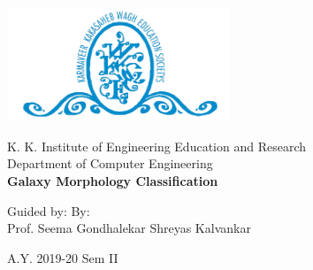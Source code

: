 \begin{titlepage}
    \begin{center}
        \begin{center}
             \includegraphics[width=0.5\textwidth]{figures/Logo.png}
        \end{center}
        \Large
        K. K. Institute of Engineering Education and Research\\
        Department of Computer Engineering\\
        \vspace{1.2in}
        \Huge
        \textbf{Galaxy Morphology Classification}
        \vspace*{1in}
        
        \Large
        Guided by:                  \hfill                 By: \hspace*{1.35in} \\
        Prof. Seema Gondhalekar     \hfill           Shreyas Kalvankar
        
        \vspace*{1.5in}
        
        A.Y. 2019-20 Sem II
    \end{center}
\end{titlepage}